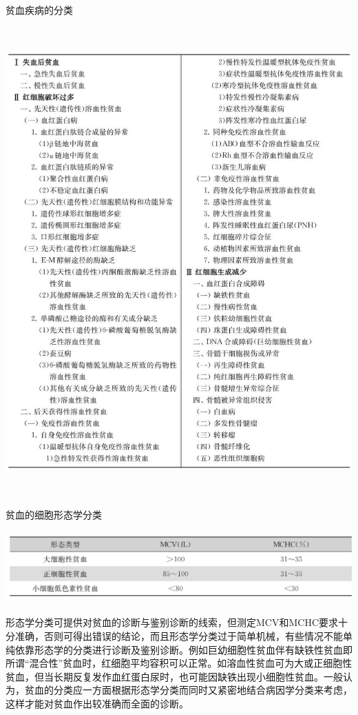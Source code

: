 \begin{table}[htbp]
\centering
\caption{贫血疾病的分类}
\label{tab33-1}
\includegraphics[width=5.91667in,height=7.08333in]{./images/Image00163.jpg}
\end{table}

\begin{table}[htbp]
\centering
\caption{贫血的细胞形态学分类}
\label{tab33-2}
\includegraphics[width=5.90625in,height=1.08333in]{./images/Image00164.jpg}
\end{table}

形态学分类可提供对贫血的诊断与鉴别诊断的线索，但测定MCV和MCHC要求十分准确，否则可得出错误的结论，而且形态学分类过于简单机械，有些情况不能单纯依靠形态学的分类进行诊断及鉴别诊断。例如巨幼细胞性贫血伴有缺铁性贫血即所谓“混合性”贫血时，红细胞平均容积可以正常。如溶血性贫血可为大或正细胞性贫血，但当长期反复发作血红蛋白尿时，也可能因缺铁出现小细胞性贫血。一般认为，贫血的分类应一方面根据形态学分类而同时又紧密地结合病因学分类来考虑，这样才能对贫血作出较准确而全面的诊断。

